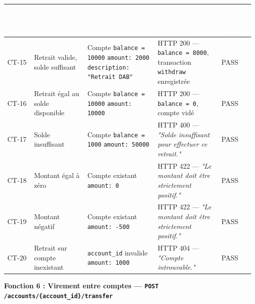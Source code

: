 \documentclass[12pt,a4paper]{article}
\begin{document}
\begin{longtable}{|L{1.6cm}|L{3.8cm}|L{5.2cm}|L{4.2cm}|L{1.8cm}|}
\hline
{}
\textbf{\textcolor{white}{Test Case ID}} & \textbf{\textcolor{white}{Test Case Description}} & \textbf{\textcolor{white}{Test Input (Test Case Value)}} & \textbf{\textcolor{white}{Expected Results}} & \textbf{\textcolor{white}{Test Case Status}} \\
\hline
CT-15 & Retrait valide, solde suffisant & Compte \texttt{balance = 10000} \newline \texttt{amount: 2000} \newline \texttt{description: "Retrait DAB"} & HTTP 200 — \texttt{balance = 8000}, transaction \texttt{withdraw} enregistrée & PASS \\
\hline
{}
CT-16 & Retrait égal au solde disponible & Compte \texttt{balance = 10000} \newline \texttt{amount: 10000} & HTTP 200 — \texttt{balance = 0}, compte vidé & PASS \\
\hline
CT-17 & Solde insuffisant & Compte \texttt{balance = 1000} \newline \texttt{amount: 50000} & HTTP 400 — \textit{"Solde insuffisant pour effectuer ce retrait."} & PASS \\
\hline
{}
CT-18 & Montant égal à zéro & Compte existant \newline \texttt{amount: 0} & HTTP 422 — \textit{"Le montant doit être strictement positif."} & PASS \\
\hline
CT-19 & Montant négatif & Compte existant \newline \texttt{amount: -500} & HTTP 422 — \textit{"Le montant doit être strictement positif."} & PASS \\
\hline
{}
CT-20 & Retrait sur compte inexistant & \texttt{account\_id} invalide \newline \texttt{amount: 1000} & HTTP 404 — \textit{"Compte introuvable."} & PASS \\
\hline
\end{longtable}

\vspace{0.2cm}
{\bfseries\textcolor{danger}{Fonction 6 : Virement entre comptes — \texttt{POST /accounts/\{account\_id\}/transfer}}}
\vspace{0.1cm}
\end{document}
